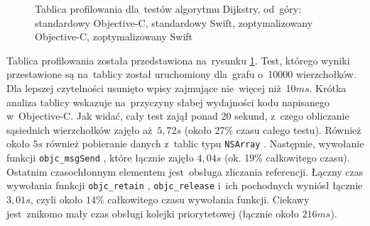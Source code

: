 \documentclass[mgr, shortabstract]{iithesis}
\newcommand{\objcinline}[1]{
    \texttt{#1}
}
\begin{document}
\begin{figure}
    \caption{Tablica profilowania dla~testów algorytmu Dijkstry, od~góry: standardowy Objective-C, standardowy Swift, zoptymalizowany Objective-C, zoptymalizowany Swift }
    \label{i:dijkstra}
\end{figure}

Tablica profilowania została przedstawiona na~rysunku \ref{i:dijkstra}. Test, którego wyniki przestawione są na~tablicy został uruchomiony dla~grafu o~10000 wierzchołków. Dla lepszej czytelności usunięto wpisy zajmujące nie~więcej niż 10$ms$. Krótka analiza tablicy wskazuje na~przyczyny słabej wydajności kodu napisanego w~Objective-C. Jak widać, cały test zajął ponad 20 sekund, z~czego obliczanie sąsiednich wierzchołków zajęło aż~$5,72s$ (około 27\% czasu całego testu). Również około $5s$ również pobieranie danych z~tablic typu \objcinline{NSArray}. Następnie, wywołanie funkcji \objcinline{objc_msgSend}, które łącznie zajęło $4,04s$ (ok. 19\% całkowitego czasu). Ostatnim czasochłonnym elementem jest~obsługa zliczania referencji. Łączny czas wywołania funkcji \objcinline{objc_retain}, \objcinline{objc_release} i~ich pochodnych wyniósł łącznie $3,01s$, czyli około $14\%$ całkowitego czasu wywołania funkcji. Ciekawy jest~znikomo mały czas obsługi kolejki priorytetowej (łącznie około $216ms$).
\end{document}
